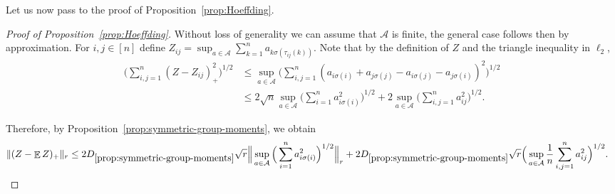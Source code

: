 \documentclass[a4paper]{amsart}
\theoremstyle{definition}
\theoremstyle{remark}
\numberwithin{equation}{section}
\newcommand*{\ds}{D_{\ref{prop:symmetric-group-moments}}}
\DeclareMathOperator{\EE}{\mathbb{E}} %
\begin{document}
Let us now pass to the proof of Proposition~\ref{prop:Hoeffding}.

\begin{proof}[Proof of Proposition~\ref{prop:Hoeffding}] Without loss of generality we can assume that $\mathcal{A}$ is finite, the general case follows then by approximation.
For $i,j \in [n]$ define $Z_{ij} = \sup_{a\in \mathcal{A}} \sum_{k=1}^n a_{k\sigma(\tau_{ij}(k))}$. Note that by the definition of $Z$ and the triangle inequality in $\ell_2$,
\begin{align*}
  \Big(\sum_{ i,j=1}^n (Z - Z_{ij})_+^2\Big)^{1/2} &\le \sup_{a\in \mathcal{A}}\Big(\sum_{i,j=1}^n (a_{i\sigma(i)} + a_{j\sigma(j)} - a_{i\sigma(j)} - a_{j\sigma(i)})^2\Big)^{1/2}\\
  &\le 2\sqrt{n}\sup_{a\in \mathcal{A}}\Big(\sum_{i=1}^n a_{i\sigma(i)}^2\Big)^{1/2} + 2\sup_{a\in \mathcal{A}} \Big(\sum_{i,j=1}^n a_{ij}^2\Big)^{1/2}.
\end{align*}

Therefore, by Proposition~\ref{prop:symmetric-group-moments}, we obtain
\begin{align}\label{eq:Hoeffding-proof-added-1}
  \|(Z-\EE Z)_+\|_r & \le
  2\ds\sqrt{r} \Big\|\sup_{a\in \mathcal{A}}\Big(\sum_{i=1}^n a_{i\sigma(i)}^2\Big)^{1/2}\Big\|_r
  + 2\ds\sqrt{r} \Big( \sup_{a\in \mathcal{A}} \frac{1}{n}\sum_{i,j=1}^n a_{ij}^2\Big)^{1/2} .
\end{align}



\end{proof}
\end{document}
